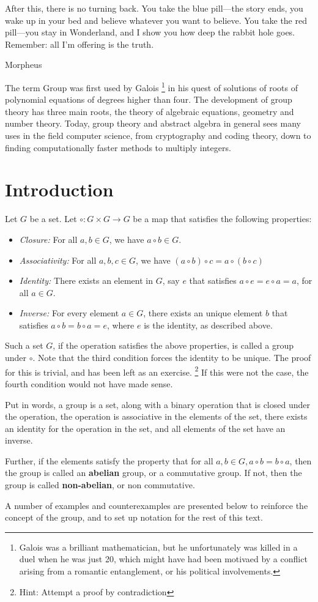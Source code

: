 \epigraph{After this, there is no turning back. You take the blue pill—the story ends, you wake up in your bed and believe whatever you want to believe. You take the red pill—you stay in Wonderland, and I show you how deep the rabbit hole goes. Remember: all I'm offering is the truth.}{Morpheus}
\par
The term Group was first used by Galois \footnote{Galois was a brilliant mathematician, but he unfortunately was killed in a duel when he was just 20, which might have had been motivaed by a conflict arising from a romantic entanglement, or his political involvements.} in his quest of solutions of roots of polynomial equations of degrees higher than four.
The development of group theory has three main roots, the theory of algebraic equations, geometry and number theory.
Today, group theory and abstract algebra in general sees many uses in the field computer science, from cryptography and coding theory, down to finding computationally faster methods to multiply integers.
\section{Introduction}
\begin{definition} \label{def:group}
  Let $G$ be a set.
  Let $ \circ : G \times G \rightarrow G $  be a map that satisfies the following properties:
  \begin{itemize}
    \item \textit{Closure:} For all $a, b \in G$, we have $a \circ b \in G$.
    \item \textit{Associativity:} For all $a, b, c \in G$, we have $(a \circ b) \circ c = a \circ (b \circ c)$
    \item \textit{Identity:} There exists an element in $G$, say $e$ that satisfies $a \circ e = e \circ a = a$, for all $a \in G$.
    \item \textit{Inverse:} For every element $a \in G$, there exists an unique element $b$ that satisfies $a \circ b = b \circ a = e$, where $e$ is the identity, as described above.
  \end{itemize}
  Such a set $G$, if the operation satisfies the above properties, is called a group under $\circ$.
  Note that the third condition forces the identity to be unique.
  The proof for this is trivial, and has been left as an exercise. \footnote{Hint: Attempt a proof by contradiction}
  If this were not the case, the fourth condition would not have made sense.
\end{definition}
Put in words, a group is a set, along with a binary operation that is closed under the operation, the operation is associative in the elements of the set, there exists an identity for the operation in the set, and all elements of the set have an inverse.
\par
Further, if the elements satisfy the property that for all $a, b \in G, a \circ b = b \circ a$, then the group is called an \textbf{abelian} group, or a commutative group.
If not, then the group is called \textbf{non-abelian}, or non commutative.
\par
A number of examples and counterexamples are presented below to reinforce the concept of the group, and to set up notation for the rest of this text.
